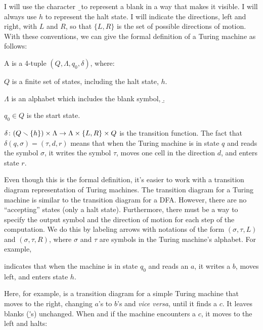 I will use the character \b\ to represent a blank in a way
that makes it visible.  I will always use $h$ to represent the halt
state.  I will indicate the directions, left and right, with
$L$ and $R$, so that $\{L,R\}$ is the set of possible directions of
motion.  With these conventions, we can give the formal definition of
a Turing machine as follows:

\begin{definition}
A  is a 4-tuple $(Q,\Lambda,q_0,\delta)$,
where:

$Q$ is a finite set of states, including the halt state, $h$.

$\Lambda$ is an alphabet which includes the blank symbol, \b.

$q_0\in Q$ is the start state.

$\delta\colon (Q\smallsetminus\{h\})\times\Lambda \to \Lambda\times 
\{L,R\}\times Q$ is the transition function.  The fact that
$\delta(q,\sigma)=(\tau,d,r)$ means that when the Turing machine is
in state $q$ and reads the symbol $\sigma$, it writes the symbol
$\tau$, moves one cell in the direction $d$, and enters state $r$.

\end{definition}

\medskip

Even though this is the formal definition, it's easier to work with
a transition diagram representation of Turing machines.  The transition
diagram for a Turing machine is similar to the transition diagram for
a DFA.  However, there are no ``accepting'' states (only a halt state).
Furthermore, there must be a way to specify the output symbol and
the direction of motion for each step of the computation.
We do this by labeling arrows with notations of the
form $(\sigma,\tau,L)$ and $(\sigma,\tau,R)$, where
$\sigma$ and $\tau$ are symbols in the Turing machine's alphabet.
For example,


\noindent indicates that when the machine is in state $q_0$ and
reads an $a$, it writes a $b$, moves left, and enters state $h$.


Here, for example, is a transition diagram for a simple Turing machine
that moves to the right, changing $a$'s to $b$'s and \textit{vice
versa}, until it finds a $c$.  It leaves blanks (\b's) unchanged.
When and if the machine encounters a $c$, it moves to the left
and halts:

